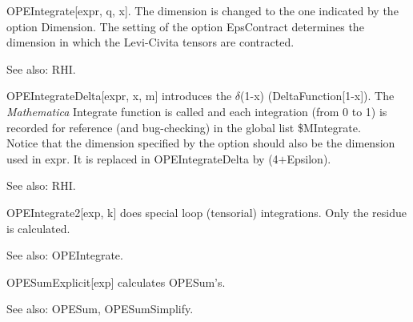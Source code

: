 

OPEIntegrate[expr, q, x]. { }The dimension is changed to the one indicated by the option { }Dimension. The setting of the option
  EpsContract determines { }the dimension in which the Levi-Civita tensors are contracted.

See also:  RHI.





OPEIntegrateDelta[expr, x, m] introduces the \(\delta \)(1-x) (DeltaFunction[1-x]). The {\itshape Mathematica} Integrate function is called and each
integration { }(from 0 to 1) is recorded for reference (and bug-checking) in the global list
  \${}MIntegrate. \\
Notice that the dimension specified by the option should also be the dimension used in expr. It is replaced in OPEIntegrateDelta by
  (4\(+\)Epsilon).

See also:  RHI.


\dispSFinmath{
\{ \} 
}



OPEIntegrate2[exp, k] does special loop (tensorial) integrations. { }Only the residue is calculated.

See also:  OPEIntegrate.





OPESumExplicit[exp] calculates OPESum's.

See also:  OPESum, OPESumSimplify.


\dispSFinmath{
\{ \} 
}


\dispSFinmath{
\{ \} 
}


\dispSFinmath{
\{ \} 
}


\dispSFinmath{
\{ \} 
}



